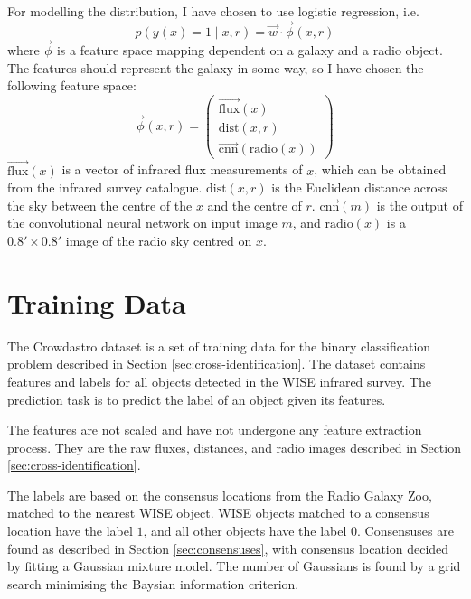     For modelling the distribution, I have chosen to use logistic regression,
    i.e.
    \begin{equation}
        \label{eq:logistic-regression-cross-identification}
        p(y(x) = 1 \mid x, r) = \vec w \cdot \vec \phi(x, r)
    \end{equation}
    where $\vec \phi$ is a feature space mapping dependent on a galaxy and a
    radio object. The features should represent the galaxy in some way, so I
    have chosen the following feature space:
    \begin{equation}
        \label{eq:galaxy-features}
        \vec \phi(x, r) = \begin{pmatrix}
            \vec{\mbox{flux}}(x)\\
            \mbox{dist}(x, r)\\
            \vec{\mbox{cnn}}(\mbox{radio}(x))
        \end{pmatrix}
    \end{equation}
    $\vec{\mbox{flux}}(x)$ is a vector of infrared flux measurements of $x$,
    which can be obtained from the infrared survey catalogue. $\mbox{dist}(x,
    r)$ is the Euclidean distance across the sky between the centre of the $x$
    and the centre of $r$. $\vec{\mbox{cnn}}(m)$ is the output of the
    convolutional neural network on input image $m$, and $\mbox{radio}(x)$ is a
    $0.8' \times 0.8'$ image of the radio sky centred on $x$.

\section{Training Data}
\label{sec:training-data}
  
  The Crowdastro dataset is a set of training data for the binary
  classification problem described in Section \ref{sec:cross-identification}.
  The dataset contains features and labels for all objects detected in the WISE
  infrared survey. The prediction task is to predict the label of an object
  given its features.

  The features are not scaled and have not undergone any feature extraction
  process. They are the raw fluxes, distances, and radio images described in
  Section \ref{sec:cross-identification}.

  The labels are based on the consensus locations from the Radio Galaxy Zoo,
  matched to the nearest WISE object. WISE objects matched to a consensus
  location have the label $1$, and all other objects have the label $0$.
  Consensuses are found as described in Section \ref{sec:consensuses}, with
  consensus location decided by fitting a Gaussian mixture model. The number of
  Gaussians is found by a grid search minimising the Baysian information
  criterion.


